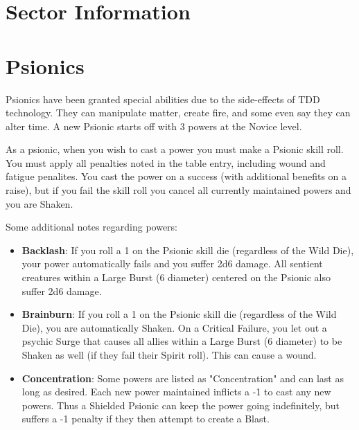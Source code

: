 \documentclass[10pt,twoside]{article}
\begin{document}
  \section{Sector Information}
  
  \newpage


  \section{Psionics}

  \begin{multicols}{2}

  Psionics have been granted special abilities due to the side-effects of TDD technology. They can manipulate matter, create fire, and some even say they can alter time. A new Psionic starts off with 3 powers at the Novice level.

  As a psionic, when you wish to cast a power you must make a Psionic skill roll. You must apply all penalties noted in the table entry, including wound and fatigue penalites. You cast the power on a success (with additional benefits on a raise), but if you fail the skill roll you cancel all currently maintained powers and you are Shaken.

  Some additional notes regarding powers:

  \begin{itemize}

    \item \textbf{Backlash}: If you roll a 1 on the Psionic skill die (regardless of the Wild Die), your power automatically fails and you suffer 2d6 damage. All sentient creatures within a Large Burst (6 diameter) centered on the Psionic also suffer 2d6 damage.

    \item \textbf{Brainburn}: If you roll a 1 on the Psionic skill die (regardless of the Wild Die), you are automatically Shaken. On a Critical Failure, you let out a psychic Surge that causes all allies within a Large Burst (6 diameter) to be Shaken as well (if they fail their Spirit roll). This can cause a wound.

    \item \textbf{Concentration}: Some powers are listed as "Concentration" and can last as long as desired. Each new power maintained inflicts a -1 to cast any new powers. Thus a Shielded Psionic can keep the power going indefinitely, but suffers a -1 penalty if they then attempt to create a Blast.


\end{itemize}
\end{multicols}
\end{document}
